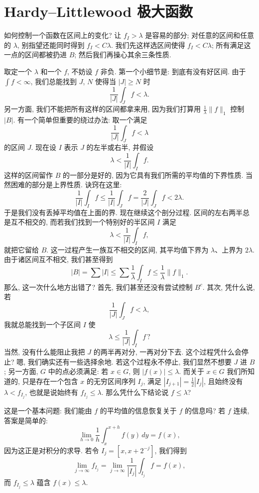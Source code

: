 \section{Hardy--Littlewood 极大函数}
\label{sec:2.4}

如何控制一个函数在区间上的变化? 让 $f_I>\lambda$ 是容易的部分; 对任意的区间和任意的 $\lambda$, 别指望还能同时得到 $f_I<C\lambda$. 我们先这样选区间使得 $f_I<C\lambda$; 所有满足这一点的区间都被扔进 $B$; 然后我们再操心其余三条性质.

取定一个 $\lambda$ 和一个 $f$, 不妨设 $f$ 非负. 第一个小细节是: 到底有没有好区间. 由于 $\int f<\infty$, 我们总能找到 $J$, $N$ 使得当 $|J|\geq N$ 时
\[
\frac{1}{\left|J\right|}\int_{J}f<\lambda.
\]
另一方面, 我们不能把所有这样的区间都拿来用, 因为我们打算用 $\frac{1}{\lambda}\|f\|_{1}$ 控制 $|B|$. 有一个简单但重要的绕过办法: 取一个满足
\[
\frac{1}{\left|J\right|}\int_{J}f<\lambda
\]
的区间 $J$. 现在设 $I$ 表示 $J$ 的左半或右半, 并假设
\[
\lambda<\frac{1}{|I|}\int_{I}f.
\]
这样的区间留作 $B$ 的一部分是好的, 因为它具有我们所需的平均值的下界性质. 当然困难的部分是上界性质. 诀窍在这里:
\[
\frac{1}{\left|I\right|}\int_{I}f\leq\frac{1}{\left|I\right|}\int_{J}f
=\frac{2}{\left|J\right|}\int_{J}f<2\lambda.
\]
于是我们没有丢掉平均值在上面的界. 现在继续这个剖分过程. 区间的左右两半总是互不相交的, 而若我们找到一个特别好的半区间 $I$ 满足
\[
\lambda<\frac{1}{|I|}\int_{I}f,
\]
就把它留给 $B$. 这一过程产生一族互不相交的区间, 其平均值下界为 $\lambda$、上界为 $2\lambda$. 由于诸区间互不相交, 我们甚至得到
\[
|B|=\sum|I|\leq\sum\frac{1}{\lambda}\int_{I}f\leq\frac{1}{\lambda}\|f\|_{1}.
\]
那么, 这一次什么地方出错了? 首先, 我们甚至还没有尝试控制 $B^{c}$. 其次, 凭什么说, 若
\[
\frac{1}{|J|}\int_{J}f<\lambda,
\]
我就总能找到一个子区间 $I$ 使
\[
\lambda\leq\frac{1}{|J|}\int_{I}f\,?
\]
当然, 没有什么能阻止我把 $J$ 的两半再对分, 一再对分下去. 这个过程凭什么会停止? 嗯, 我们确实还有一些选择余地. 若这个过程永不停止, 我们显然不想要 $J$ 进 $B$; 另一方面, $G$ 中的点必须满足: 若 $x\in G$, 则 $|f(x)|\leq\lambda$. 而关于 $x\in G$ 我们所知道的, 只是存在一个包含 $x$ 的无穷区间序列 $I_j$, 满足 $|I_{j+1}|=\frac{1}{2}|I_j|$, 且始终没有 $\lambda<f_{I_j}$, 也就是说始终有 $f_{I_j}\leq\lambda$. 那么凭什么下结论说 $f\leq\lambda$?

这是一个基本问题: 我们能由 $f$ 的平均值的信息恢复关于 $f$ 的信息吗? 若 $f$ 连续, 答案是简单的:
\[
\lim_{h\to0}\frac{1}{h}\int_{x}^{x+h}f(y)\,dy=f(x),
\]
因为这正是对积分的求导. 若令 $I_{j}=[x,x+2^{-j}]$, 我们得到
\[
\lim_{j\to\infty}f_{I_{j}}=\lim_{j\to\infty}\frac{1}{|I_{j}|}\int_{I_{j}}f=f(x),
\]
而 $f_{I_j}\leq\lambda$ 蕴含 $f(x)\leq\lambda$.

